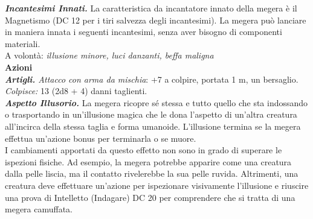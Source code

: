 \begin{multicols}{2}
\emph{\textbf{Incantesimi Innati.}} La caratteristica da incantatore innato della megera è il Magnetismo (DC 12 per i tiri salvezza degli incantesimi). La megera può lanciare in maniera innata i seguenti incantesimi, senza aver bisogno di componenti materiali.\\

A volontà: \emph{illusione minore, luci danzanti, beffa maligna}\\

\smallskip\textbf{Azioni}\\

\emph{\textbf{Artigli.} Attacco con arma da mischia}: +7 a colpire, portata 1 m, un bersaglio.\\

\emph{Colpisce:} 13 (2d8 + 4) danni taglienti.\\

\emph{\textbf{Aspetto Illusorio.}} La megera ricopre sé stessa e tutto quello che sta indossando o trasportando in un'illusione magica che le dona l'aspetto di un'altra creatura all'incirca della stessa taglia e forma umanoide. L'illusione termina se la megera effettua un'azione bonus per terminarla o se muore.\\

I cambiamenti apportati da questo effetto non sono in grado di superare le ispezioni fisiche. Ad esempio, la megera potrebbe apparire come una creatura dalla pelle liscia, ma il contatto rivelerebbe la sua pelle ruvida. Altrimenti, una creatura deve effettuare un'azione per ispezionare visivamente l'illusione e riuscire una prova di Intelletto (Indagare) DC 20 per comprendere che si tratta di una megera camuffata.\\


\end{multicols}
